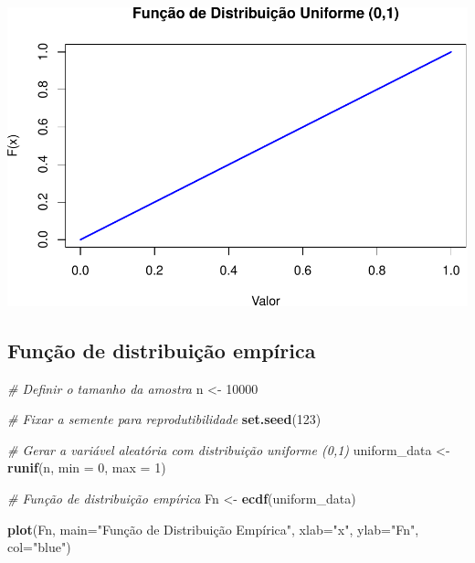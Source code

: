 \documentclass[
]{book}
\newenvironment{Shaded}{\begin{snugshade}}{\end{snugshade}}
\newcommand{\AttributeTok}[1]{\textcolor[rgb]{0.13,0.29,0.53}{#1}}
\newcommand{\CommentTok}[1]{\textcolor[rgb]{0.56,0.35,0.01}{\textit{#1}}}
\newcommand{\DecValTok}[1]{\textcolor[rgb]{0.00,0.00,0.81}{#1}}
\newcommand{\FunctionTok}[1]{\textcolor[rgb]{0.13,0.29,0.53}{\textbf{#1}}}
\newcommand{\NormalTok}[1]{#1}
\newcommand{\OtherTok}[1]{\textcolor[rgb]{0.56,0.35,0.01}{#1}}
\newcommand{\StringTok}[1]{\textcolor[rgb]{0.31,0.60,0.02}{#1}}
\begin{document}
\includegraphics{introR_files/figure-latex/unnamed-chunk-272-1.pdf}

\subsection{Função de distribuição empírica}\label{funuxe7uxe3o-de-distribuiuxe7uxe3o-empuxedrica-3}

\begin{Shaded}
\begin{Highlighting}[]
\CommentTok{\# Definir o tamanho da amostra}
\NormalTok{n }\OtherTok{\textless{}{-}} \DecValTok{10000}

\CommentTok{\# Fixar a semente para reprodutibilidade}
\FunctionTok{set.seed}\NormalTok{(}\DecValTok{123}\NormalTok{)}

\CommentTok{\# Gerar a variável aleatória com distribuição uniforme (0,1)}
\NormalTok{uniform\_data }\OtherTok{\textless{}{-}} \FunctionTok{runif}\NormalTok{(n, }\AttributeTok{min =} \DecValTok{0}\NormalTok{, }\AttributeTok{max =} \DecValTok{1}\NormalTok{)}

\CommentTok{\# Função de distribuição empírica}
\NormalTok{Fn }\OtherTok{\textless{}{-}} \FunctionTok{ecdf}\NormalTok{(uniform\_data)}

\FunctionTok{plot}\NormalTok{(Fn, }\AttributeTok{main=}\StringTok{"Função de Distribuição Empírica"}\NormalTok{,}
     \AttributeTok{xlab=}\StringTok{"x"}\NormalTok{,}
     \AttributeTok{ylab=}\StringTok{"Fn"}\NormalTok{,}
     \AttributeTok{col=}\StringTok{"blue"}\NormalTok{)}
\end{Highlighting}
\end{Shaded}
\end{document}
